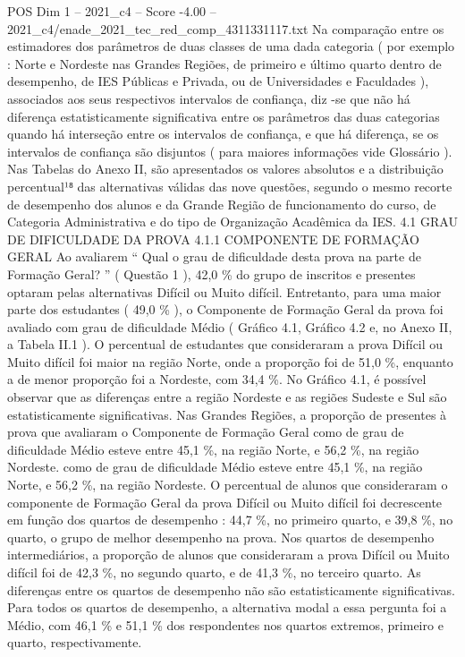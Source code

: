 \begin{textsample}{POS Dim 1 – 2021\_c4 – Score -4.00 – 2021\_c4/enade\_2021\_tec\_red\_comp\_4311331117.txt}
Na comparação entre os estimadores dos parâmetros de duas classes de uma dada categoria ( por exemplo : Norte e Nordeste nas Grandes Regiões, de primeiro e último quarto dentro de desempenho, de IES Públicas e Privada, ou de Universidades e Faculdades ), associados aos seus respectivos intervalos de confiança, diz -se que não há diferença estatisticamente significativa entre os parâmetros das duas categorias quando há interseção entre os intervalos de confiança, e que há diferença, se os intervalos de confiança são disjuntos ( para maiores informações vide Glossário ).
Nas Tabelas do Anexo II, são apresentados os valores absolutos e a distribuição percentual¹⁸ das alternativas válidas das nove questões, segundo o mesmo recorte de desempenho dos alunos e da Grande Região de funcionamento do curso, de Categoria Administrativa e do tipo de Organização Acadêmica da IES. 4.1 GRAU DE DIFICULDADE DA PROVA 4.1.1 COMPONENTE DE FORMAÇÃO GERAL Ao avaliarem “ Qual o grau de dificuldade desta prova na parte de Formação Geral? ” ( Questão 1 ), 42,0 \% do grupo de inscritos e presentes optaram pelas alternativas Difícil ou Muito difícil.
Entretanto, para uma maior parte dos estudantes ( 49,0 \% ), o Componente de Formação Geral da prova foi avaliado com grau de dificuldade Médio ( Gráfico 4.1, Gráfico 4.2 e, no Anexo II, a Tabela II.1 ).
O percentual de estudantes que consideraram a prova Difícil ou Muito difícil foi maior na região Norte, onde a proporção foi de 51,0 \%, enquanto a de menor proporção foi a Nordeste, com 34,4 \%.
No Gráfico 4.1, é possível observar que as diferenças entre a região Nordeste e as regiões Sudeste e Sul são estatisticamente significativas.
Nas Grandes Regiões, a proporção de presentes à prova que avaliaram o Componente de Formação Geral como de grau de dificuldade Médio esteve entre 45,1 \%, na região Norte, e 56,2 \%, na região Nordeste. como de grau de dificuldade Médio esteve entre 45,1 \%, na região Norte, e 56,2 \%, na região Nordeste.
O percentual de alunos que consideraram o componente de Formação Geral da prova Difícil ou Muito difícil foi decrescente em função dos quartos de desempenho : 44,7 \%, no primeiro quarto, e 39,8 \%, no quarto, o grupo de melhor desempenho na prova.
Nos quartos de desempenho intermediários, a proporção de alunos que consideraram a prova Difícil ou Muito difícil foi de 42,3 \%, no segundo quarto, e de 41,3 \%, no terceiro quarto.
As diferenças entre os quartos de desempenho não são estatisticamente significativas.
Para todos os quartos de desempenho, a alternativa modal a essa pergunta foi a Médio, com 46,1 \% e 51,1 \% dos respondentes nos quartos extremos, primeiro e quarto, respectivamente.

\end{textsample}
